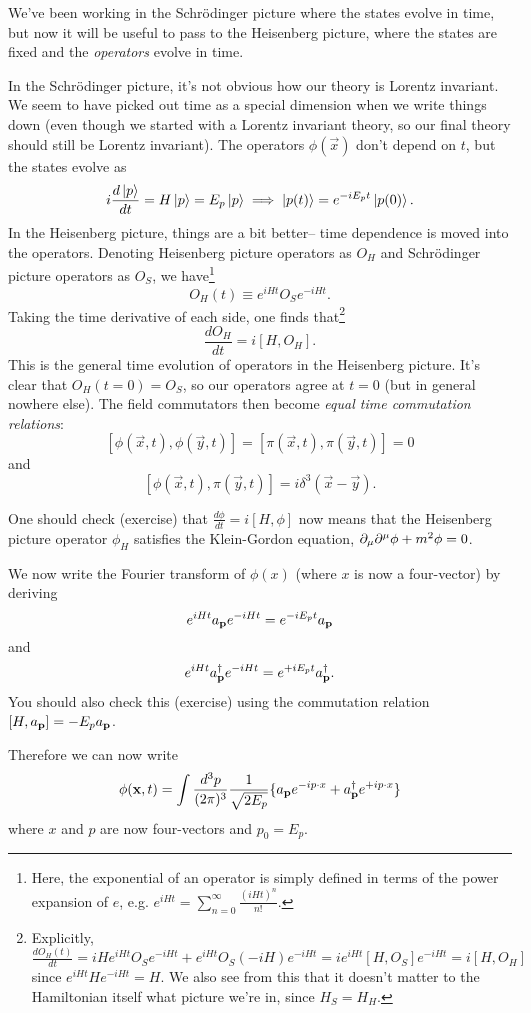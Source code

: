 We've been working in the Schr\"odinger picture where the states evolve in time, but now it will be useful to pass to the Heisenberg picture, where the states are fixed and the \emph{operators} evolve in time.

In the Schr\"odinger picture, it's not obvious how our theory is Lorentz invariant. We seem to have picked out time as a special dimension when we write things down (even though we started with a Lorentz invariant theory, so our final theory should still be Lorentz invariant). The operators $\phi(\vec x)$ don't depend on $t$, but the states evolve as
$$i \frac{d\left| p \right>}{dt}=H\left| p \right> = E_p\left| p \right> \implies \left| p(t) \right>= e^{-i E_pt} \left| p(0) \right>.$$
In the Heisenberg picture, things are a bit better-- time dependence is moved into the operators. Denoting Heisenberg picture operators as $O_H$ and Schr\"odinger picture operators as $O_S$, we have\footnote{Here, the exponential of an operator is simply defined in terms of the power expansion of $e$, e.g. $e^{iHt}=\sum_{n=0}^\infty \frac{(iHt)^n}{n!}$.}
$$O_H(t) \equiv e^{iHt}O_S e^{-iHt}.$$
Taking the time derivative of each side, one finds that\footnote{Explicitly, $\frac{d O_H(t)}{dt}= iH e^{iHt} O_S e^{-iHt}+e^{iHt}O_S (-iH) e^{-iHt} = i e^{iHt} [H,O_S] e^{-iHt} = i[H,O_H]$ since $e^{iHt}H e^{-iHt}=H$. We also see from this that it doesn't matter to the Hamiltonian itself what picture we're in, since $H_S=H_H$.}
$$\frac{dO_H}{dt}=i[H,O_H].$$
This is the general time evolution of operators in the Heisenberg picture. It's clear that $O_H(t=0)=O_S$, so our operators agree at $t=0$ (but in general nowhere else). The field commutators then become \emph{equal time commutation relations}:
$$[\phi(\vec x,t),\phi(\vec y, t)]=[\pi(\vec x, t), \pi(\vec y,t)]=0$$
and
$$[\phi(\vec x, t), \pi (\vec y, t)]=i \delta^3(\vec x-\vec y).$$

\begin{ex}\label{heisenbergkleingordon}
One should check (exercise) that $\frac{d\phi}{dt}=i[H,\phi]$ now means that the Heisenberg picture operator $\phi_H$ satisfies the Klein-Gordon equation, $\partial_\mu \partial^\mu \phi+ m^2 \phi=0$.
\end{ex}
We now write the Fourier transform of $\phi(x)$ (where $x$ is now a four-vector) by deriving
$$e^{iHt}a_{\boldsymbol{\mathbf{p}}} e^{-iHt}=e^{-iE_p t} a_{\boldsymbol{\mathbf{p}}}$$
and
$$e^{iHt}a_{\boldsymbol{\mathbf{p}}}^\dagger e^{-iHt}=e^{+iE_p t} a_{\boldsymbol{\mathbf{p}}}^\dagger.$$
You should also check this (exercise) using the commutation relation $[H,a_{\boldsymbol{\mathbf{p}}}]=-E_p a_{\boldsymbol{\mathbf{p}}}$.

Therefore we can now write
$$\phi(\boldsymbol{\mathbf{x}}, t)=\int \frac{d^3p}{(2\pi)^3} \frac{1}{\sqrt{2E_p}} \{ a_{\boldsymbol{\mathbf{p}}} e^{-i p\cdot x}+a_{\boldsymbol{\mathbf{p}}}^\dagger e^{+i p\cdot x}\}$$
where $x$ and $p$ are now four-vectors and $p_0= E_p$.

